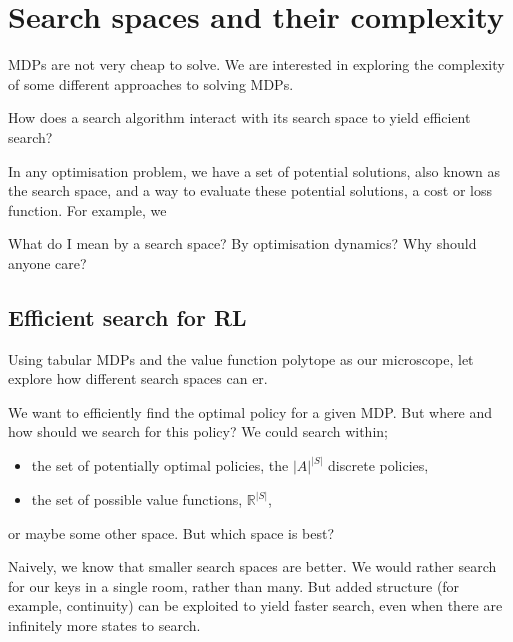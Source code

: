 \chapter{Search spaces and their complexity}

MDPs are not very cheap to solve.
We are interested in exploring the complexity of some different approaches to solving MDPs.

\begin{displayquote}
How does a search algorithm interact with its search space to yield efficient search?
\end{displayquote}

In any optimisation problem, we have a set of potential solutions, also known as the search space,
and a way to evaluate these potential solutions, a cost or loss function. For example, we

What do I mean by a search space? By optimisation dynamics? Why should anyone care?


\section{Efficient search for RL}

Using tabular MDPs and the value function polytope as our microscope,
let explore how different search spaces can er.

We want to efficiently find the optimal policy for a given MDP. But where and how should we
search for this policy? We could search within;

\begin{itemize}
\tightlist
\item
the set of potentially optimal policies, the \(|A|^{|S|}\) discrete policies,
\item
the set of possible value functions, \(\mathbb R^{|S|}\),
\end{itemize}
or maybe some other space. But which space is best?

Naively, we know that smaller search spaces are better. We would rather
search for our keys in a single room, rather than many. But added
structure (for example, continuity) can be exploited to yield faster
search, even when there are infinitely more states to search.


